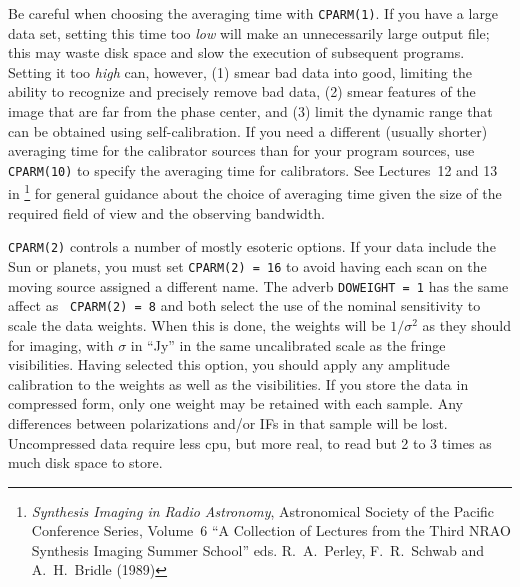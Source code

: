 
      Be careful when choosing the averaging time with {\tt CPARM(1)}.
If you have a large data set, setting this time too {\it low\/} will
make an unnecessarily large output file; this may waste disk space
and slow the execution of subsequent programs.  Setting it too {\it
high\/} can, however, (1) smear bad data into good, limiting the
ability to recognize and precisely remove bad data, (2) smear features
of the image that are far from the phase center, and (3) limit the
dynamic range that can be obtained using self-calibration.  If you
need a different (usually shorter) averaging time for the calibrator
sources than for your program sources, use {\tt CPARM(10)} to specify
the averaging time for calibrators.  See Lectures~12  and 13 in
{\it {}\/}\footnote{{\it
Synthesis Imaging in Radio Astronomy\/}, Astronomical Society of the
Pacific Conference Series, Volume~6 ``A Collection of Lectures from
the Third NRAO Synthesis Imaging Summer School'' eds.\/ R.\ A.\
Perley, F.\ R.\ Schwab and A.\ H.\ Bridle (1989)} for general guidance
about the choice of averaging time given the size of the required
field of view and the observing bandwidth.

     {\tt CPARM(2)} controls a number of mostly esoteric options.  If
your data include the Sun or planets, you must set {\tt CPARM(2) = 16}
to avoid having each scan on the moving source assigned a different
name.  The adverb {\tt DOWEIGHT = 1} has the same affect as {\tt
CPARM(2) = 8} and both select the use of the nominal sensitivity to
scale the data weights.  When this is done, the weights will be
$1/\sigma^2$ as they should for imaging, with $\sigma$ in ``Jy'' in
the same uncalibrated scale as the fringe visibilities.  Having
selected this option, you should apply any amplitude calibration to
the weights as well as the visibilities.  If you store the data in
compressed form, only one weight may be retained with each sample.
Any differences between polarizations and/or IFs in that sample will
be lost.  Uncompressed data require less cpu, but more real, to read
but 2 to 3 times as much disk space to store.

